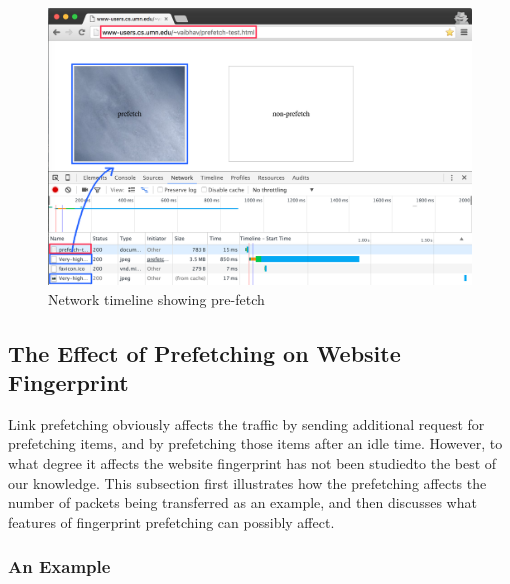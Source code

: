 \begin{figure}[t]
\includegraphics[width=\textwidth]{figures/prefetch-network-edited.png}
\centering
\caption{Network timeline showing pre-fetch}
\label{fig:network}
\end{figure}

\subsection{The Effect of Prefetching on Website Fingerprint}



Link prefetching obviously affects the traffic by sending additional request for prefetching items, and by prefetching those items after an idle time.
However, to what degree it affects the website fingerprint has not been studiedto the best of our knowledge.
This subsection first illustrates how the prefetching affects the number of packets being transferred as an example, and then discusses what features of fingerprint prefetching can possibly affect.

\subsubsection{An Example}

